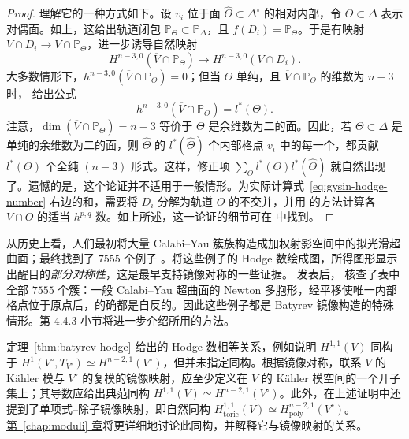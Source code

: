 \begin{proof}
理解它的一种方式如下。设 $v_i$ 位于面 $\widehat\Theta\subset\Delta^\circ$ 的相对内部，令 $\Theta\subset\Delta$ 表示对偶面。如上，这给出轨道闭包 $\mathbb P_\Theta\subset\mathbb P_\Delta$，且 $f(D_i)=\mathbb P_\Theta$。于是有映射 $V\cap D_i\to\overline V\cap\mathbb P_\Theta$，进一步诱导自然映射
\[
H^{n-3,0}(\overline V\cap\mathbb P_\Theta)
\longrightarrow H^{n-3,0}(V\cap D_i).
\]
大多数情形下，$h^{n-3,0}(\overline V\cap\mathbb P_\Theta)=0$；但当 $\Theta$ 单纯，且 $\overline V\cap\mathbb P_\Theta$ 的维数为 $n-3$ 时， 给出公式
\begin{equation}\label{eq:face-holomorphic-forms}
h^{n-3,0}(\overline V\cap\mathbb P_\Theta)=l^*(\Theta).
\end{equation}
注意，$\dim(\overline V\cap\mathbb P_\Theta)=n-3$ 等价于 $\Theta$ 是余维数为二的面。因此，若 $\Theta\subset\Delta$ 是单纯的余维数为二的面，则 $\widehat\Theta$ 的 $l^*(\widehat\Theta)$ 个内部格点 $v_i$ 中的每一个，都贡献 $l^*(\Theta)$ 个全纯 $(n-3)$ 形式。这样，修正项 $\sum_\Theta l^*(\Theta)l^*(\widehat\Theta)$ 就自然出现了。遗憾的是，这个论证并不适用于一般情形。为实际计算式~\eqref{eq:gysin-hodge-number} 右边的和，需要将 $D_i$ 分解为轨道 $O$ 的不交并，并用
 的方法计算各 $V\cap O$ 的适当 $h^{p,q}$ 数。如上所述，这一论证的细节可在  中找到。
\end{proof}

从历史上看，人们最初将大量 Calabi--Yau 簇族构造成加权射影空间中的拟光滑超曲面；最终找到了 $7555$ 个例子 。将这些例子的 Hodge 数绘成图，所得图形显示出醒目的\emph{部分对称性}，这是最早支持镜像对称的一些证据。 发表后， 核查了表中全部 $7555$ 个簇：一般 Calabi--Yau 超曲面的 Newton 多胞形，经平移使唯一内部格点位于原点后，的确都是自反的。因此这些例子都是 Batyrev 镜像构造的特殊情形。\hyperref[subsec:nonreflexive-weights]{第 4.4.3 小节}将进一步介绍所用的方法。

定理~\ref{thm:batyrev-hodge} 给出的 Hodge 数相等关系，例如说明 $H^{1,1}(V)$ 同构于 $H^1(V^\circ,T_{V^\circ})\simeq H^{n-2,1}(V^\circ)$，但并未指定同构。根据镜像对称，联系 $V$ 的 Kähler 模与 $V^\circ$ 的复模的镜像映射，应至少定义在 $V$ 的 Kähler 模空间的一个开子集上；其导数应给出典范同构 $H^{1,1}(V)\simeq H^{n-2,1}(V^\circ)$。此外，在上述证明中还提到了单项式--除子镜像映射，即自然同构 $H_{\mathrm{toric}}^{1,1}(V)\simeq H_{\mathrm{poly}}^{n-2,1}(V^\circ)$。\hyperref[chap:moduli]{第~\ref*{chap:moduli} 章}将更详细地讨论此同构，并解释它与镜像映射的关系。

